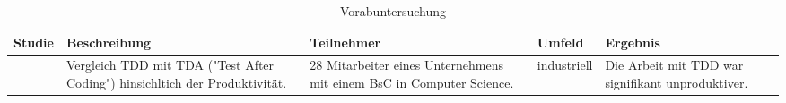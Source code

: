 
\begin{table*}[t]
\renewcommand{\arraystretch}{1.3}
\caption{Vorabuntersuchung}
\label{table:TDDVorabuntersuchung}
\centering
\begin{tabularx}{\textwidth}{@{}Xp{}p{}p{}p{}@{}}
\toprule
Studie                                       & Beschreibung                                                                                                                                                                                                                             & Teilnehmer                                                                                                                                                     & Umfeld                    & Ergebnis                                                                                                                                                                                                                                                        \\ \midrule
\cite{Canfora2006ProductivityProfessionals}  & Vergleich TDD mit TDA ("Test After Coding") hinsichltich der Produktivität.                                                                                                                                                              & 28 Mitarbeiter eines Unternehmens mit einem BsC in Computer Science.                                                                                           & industriell               & Die Arbeit mit TDD war signifikant unproduktiver.                                                                                                                                                                                                               \\

\end{tabularx}
\end{table*}
